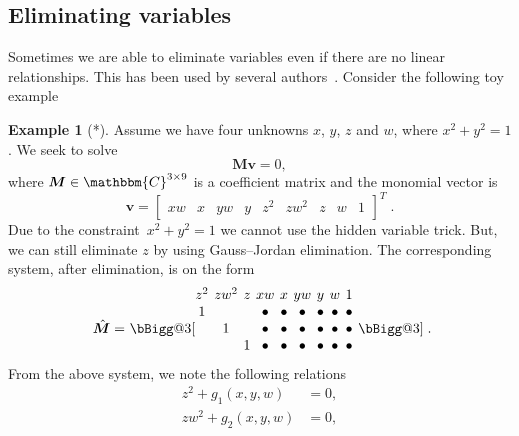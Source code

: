 \documentclass[11pt,a4paper]{article}
\makeatletter
\theoremstyle{definition}
\newtheorem{example}{Example}
\newcommand{\HUGE}{\bBigg@{3}}
\newcommand{\T}{T}
\newcommand{\mat}[1]{\bm{#1}}
\newcommand{\C}{\ensuremath{\mathbbm{C}}}
\makeatother
\begin{document}
\subsection{Eliminating variables}
Sometimes we are able to eliminate variables even if there are no linear relationships. This
has been used by several authors~\cite{kukelova-etal-cviu-2010,fraundorfer-etal-eccv-2010,jiang-etal-accv-2014,kukelova-etal-cvpr-2015,valtonenoernhag-springer-2021}.
Consider the following toy example
\begin{example}[*]
Assume we have four unknowns $x$, $y$, $z$ and $w$, where $x^2+y^2=1$. We seek to solve
\begin{equation}
\mat{M}\mat{v} = 0,
\end{equation}
where $\mat{M}\in\C^{3\times 9}$ is a coefficient matrix and the monomial vector is
\setcounter{MaxMatrixCols}{20}
\begin{equation}
    \mat{v} = \begin{bmatrix}
            xw & x &
            yw & y &
            z^2 & zw^2 & z &
            w & 1
        \end{bmatrix}^\T\;.
\end{equation}
Due to the constraint~$x^2+y^2=1$ we cannot use the hidden variable trick. But, we can still
eliminate $z$ by using Gauss--Jordan elimination. The corresponding system, after elimination, is
on the form
\begin{equation}
\raisebox{-6pt}{ $\hat{\mat{M}} =$ }
\raisebox{-6pt}{\HUGE[}
\begingroup %
\setlength\arraycolsep{2pt}
\begin{matrix}
z^2 & zw^2 & z & xw & x & yw & y & w & 1\\
    1 & & & \bullet & \bullet & \bullet & \bullet & \bullet & \bullet & \\
    & 1 & & \bullet & \bullet & \bullet & \bullet & \bullet & \bullet & \\
    & & 1 & \bullet & \bullet & \bullet & \bullet & \bullet & \bullet &
\end{matrix}
\endgroup
\raisebox{-6pt}{\HUGE]\;.}
\end{equation}
From the above system, we note the following relations
\begin{equation}\label{paper04:eq:elim}
    \begin{aligned}
    z^2 + g_1(x,y,w)  &=  0,\\
    zw^2 + g_2(x,y,w)  &=  0,\\

\end{aligned}
\end{equation}
\end{example}
\end{document}
